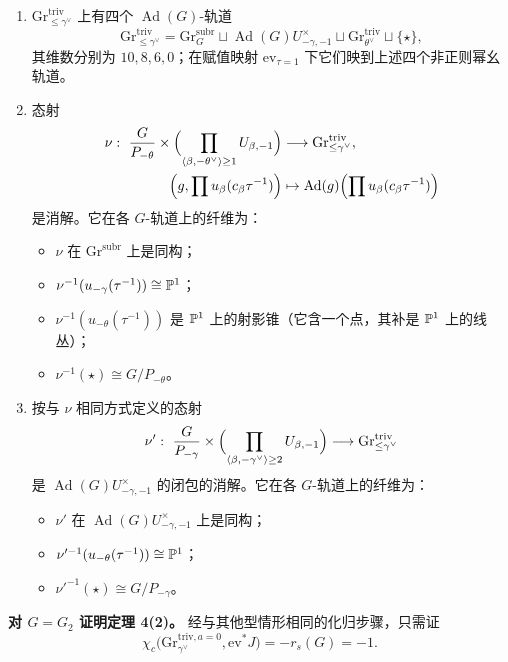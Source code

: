 \begin{lemma}
\begin{enumerate}[label=(\arabic*), leftmargin=1.9em, itemsep=.25em]
\item $\mathrm{Gr}^{\mathrm{triv}}_{\le\gamma^\vee}$ 上有四个 $\operatorname{Ad}(G)$-轨道
\[
\mathrm{Gr}^{\mathrm{triv}}_{\le\gamma^\vee}=\mathrm{Gr}^{\mathrm{subr}}_G\sqcup\operatorname{Ad}(G)U^\times_{-\gamma,-1}\sqcup\mathrm{Gr}^{\mathrm{triv}}_{\theta^\vee}\sqcup\{\star\},
\]
其维数分别为 $10,8,6,0$；在赋值映射 $\mathrm{ev}_{\tau=1}$ 下它们映到上述四个非正则幂幺轨道。
\item 态射
\[
\begin{aligned}
\nu:\ \frac{G}{P_{-\theta}}\times\Bigl(\prod_{\langle\beta,-\theta^\vee\rangle\ge1}U_{\beta,-1}\Bigr)&\longrightarrow\mathrm{Gr}^{\mathrm{triv}}_{\le\gamma^\vee},\\
\Bigl(g,\prod u_\beta(c_\beta\tau^{-1})\Bigr)&\mapsto\operatorname{Ad}(g)\Bigl(\prod u_\beta(c_\beta\tau^{-1})\Bigr)
\end{aligned}
\]
是消解。它在各 $G$-轨道上的纤维为：
\begin{itemize}[leftmargin=1.4em, itemsep=.1em]
\item $\nu$ 在 $\mathrm{Gr}^{\mathrm{subr}}$ 上是同构；
\item $\nu^{-1}(u_{-\gamma}(\tau^{-1}))\cong\mathbb{P}^1$；
\item $\nu^{-1}(u_{-\theta}(\tau^{-1}))$ 是 $\mathbb{P}^1$ 上的射影锥（它含一个点，其补是 $\mathbb{P}^1$ 上的线丛）；
\item $\nu^{-1}(\star)\cong G/P_{-\theta}$。
\end{itemize}
\item 按与 $\nu$ 相同方式定义的态射
\[
\nu':\ \frac{G}{P_{-\gamma}}\times\Bigl(\prod_{\langle\beta,-\gamma^\vee\rangle\ge2}U_{\beta,-1}\Bigr)\longrightarrow\mathrm{Gr}^{\mathrm{triv}}_{\le\gamma^\vee}
\]
是 $\operatorname{Ad}(G)U^\times_{-\gamma,-1}$ 的闭包的消解。它在各 $G$-轨道上的纤维为：
\begin{itemize}[leftmargin=1.4em, itemsep=.1em]
\item $\nu'$ 在 $\operatorname{Ad}(G)U^\times_{-\gamma,-1}$ 上是同构；
\item $\nu'^{-1}(u_{-\theta}(\tau^{-1}))\cong\mathbb{P}^1$；
\item $\nu'^{-1}(\star)\cong G/P_{-\gamma}$。
\end{itemize}
\end{enumerate}
\end{lemma}

\noindent\textbf{对 $G=G_2$ 证明定理 4(2)。} 经与其他型情形相同的化归步骤，只需证
\begin{equation}
\chi_c\bigl(\mathrm{Gr}^{\mathrm{triv},a=0}_{\gamma^\vee},\mathrm{ev}^*J\bigr)=-r_s(G)=-1.
\end{equation}

